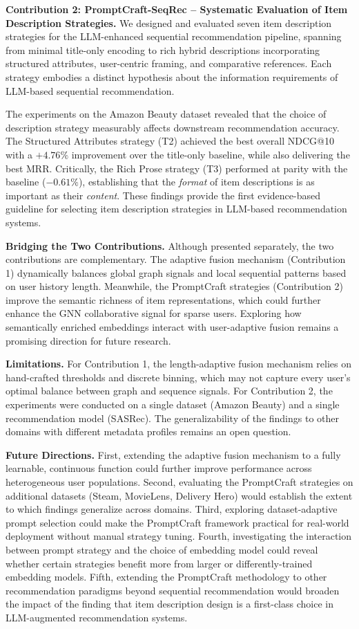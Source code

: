 \documentclass[12pt,a4paper]{report}
\begin{document}
\textbf{Contribution 2: PromptCraft-SeqRec -- Systematic Evaluation of Item
Description Strategies.} We designed and evaluated seven item description
strategies for the LLM-enhanced sequential recommendation pipeline, spanning
from minimal title-only encoding to rich hybrid descriptions incorporating
structured attributes, user-centric framing, and comparative references. Each
strategy embodies a distinct hypothesis about the information requirements of
LLM-based sequential recommendation.

The experiments on the Amazon Beauty dataset revealed that the choice of
description strategy measurably affects downstream recommendation accuracy.
The Structured Attributes strategy (T2) achieved the best overall NDCG@10
with a \(+4.76\%\) improvement over the title-only baseline, while also
delivering the best MRR. Critically, the Rich Prose strategy (T3) performed
at parity with the baseline (\(-0.61\%\)), establishing that the \emph{format}
of item descriptions is as important as their \emph{content}. These findings
provide the first evidence-based guideline for selecting item description
strategies in LLM-based recommendation systems.

\textbf{Bridging the Two Contributions.}
Although presented separately, the two contributions are complementary.
The adaptive fusion mechanism (Contribution 1) dynamically balances global
graph signals and local sequential patterns based on user history length.
Meanwhile, the PromptCraft strategies (Contribution 2) improve the semantic
richness of item representations, which could further enhance the GNN
collaborative signal for sparse users. Exploring how semantically enriched
embeddings interact with user-adaptive fusion remains a promising direction
for future research.

\textbf{Limitations.}
For Contribution 1, the length-adaptive fusion mechanism relies on hand-crafted
thresholds and discrete binning, which may not capture every user's optimal
balance between graph and sequence signals. For Contribution 2, the experiments
were conducted on a single dataset (Amazon Beauty) and a single recommendation
model (SASRec). The generalizability of the findings to other domains with
different metadata profiles remains an open question.

\textbf{Future Directions.}
First, extending the adaptive fusion mechanism to a fully learnable, continuous
function could further improve performance across heterogeneous user populations.
Second, evaluating the PromptCraft strategies on additional datasets (Steam,
MovieLens, Delivery Hero) would establish the extent to which findings generalize
across domains. Third, exploring dataset-adaptive prompt selection could make the
PromptCraft framework practical for real-world deployment without manual
strategy tuning. Fourth, investigating the interaction between prompt strategy
and the choice of embedding model could reveal whether certain strategies benefit
more from larger or differently-trained embedding models. Fifth, extending the
PromptCraft methodology to other recommendation paradigms beyond sequential
recommendation would broaden the impact of the finding that item description
design is a first-class choice in LLM-augmented recommendation systems.
\end{document}
